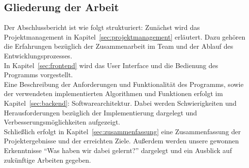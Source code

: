 \subsection{Gliederung der Arbeit}
\label{subsec:gliederung}
Der Abschlussbericht ist wie folgt strukturiert: Zunächst wird das Projektmanagement in Kapitel~\ref{sec:projektmanagement} erläutert. Dazu gehören die Erfahrungen bezüglich der Zusammenarbeit im Team und der Ablauf des Entwicklungsprozesses.\\

In Kapitel~\ref{sec:frontend} wird das User Interface und die Bedienung des Programms vorgestellt.\\

Eine Beschreibung der Anforderungen und Funktionalität des Programms, sowie der verwendeten \bzw implementierten Algorithmen und Funktionen erfolgt im Kapitel~\ref{sec:backend}: Softwarearchitektur. Dabei werden Schwierigkeiten und Herausforderungen bezüglich der Implementierung dargelegt und Verbesserungsmöglichkeiten aufgezeigt.\\

Schließlich erfolgt in Kapitel~\ref{sec:zusammenfassung} eine Zusammenfassung der Projektergebnisse und der erreichten Ziele. Außerdem werden unsere gewonnen Erkenntnisse \bzw "`Was haben wir dabei gelernt?"' dargelegt und ein Ausblick auf zukünftige Arbeiten gegeben.

